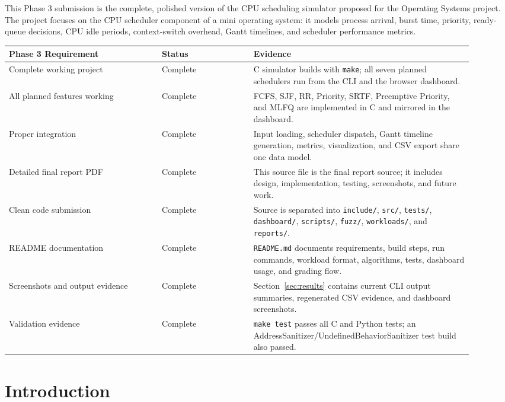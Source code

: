 \documentclass[11pt]{article}
\newcommand{\statusdone}{\textcolor{success}{Complete}}
\begin{document}
This Phase 3 submission is the complete, polished version of the CPU scheduling
simulator proposed for the Operating Systems project. The project focuses on the
CPU scheduler component of a mini operating system: it models process arrival,
burst time, priority, ready-queue decisions, CPU idle periods, context-switch
overhead, Gantt timelines, and scheduler performance metrics.

\begin{longtable}{p{0.30\linewidth}p{0.18\linewidth}p{0.43\linewidth}}
\toprule
\textbf{Phase 3 Requirement} & \textbf{Status} & \textbf{Evidence} \\
\midrule
Complete working project & \statusdone & C simulator builds with
\texttt{make}; all seven planned schedulers run from the CLI and the browser
dashboard. \\
All planned features working & \statusdone & FCFS, SJF, RR, Priority, SRTF,
Preemptive Priority, and MLFQ are implemented in C and mirrored in the
dashboard. \\
Proper integration & \statusdone & Input loading, scheduler dispatch, Gantt
timeline generation, metrics, visualization, and CSV export share one data
model. \\
Detailed final report PDF & \statusdone & This source file is the final report
source; it includes design, implementation, testing, screenshots, and future
work. \\
Clean code submission & \statusdone & Source is separated into
\texttt{include/}, \texttt{src/}, \texttt{tests/}, \texttt{dashboard/},
\texttt{scripts/}, \texttt{fuzz/}, \texttt{workloads/}, and \texttt{reports/}. \\
README documentation & \statusdone & \texttt{README.md} documents
requirements, build steps, run commands, workload format, algorithms, tests,
dashboard usage, and grading flow. \\
Screenshots and output evidence & \statusdone & Section~\ref{sec:results}
contains current CLI output summaries, regenerated CSV evidence, and dashboard
screenshots. \\
Validation evidence & \statusdone & \texttt{make test} passes all C and Python
tests; an AddressSanitizer/UndefinedBehaviorSanitizer test build also passed. \\
\bottomrule
\end{longtable}

\section{Introduction}
\end{document}
